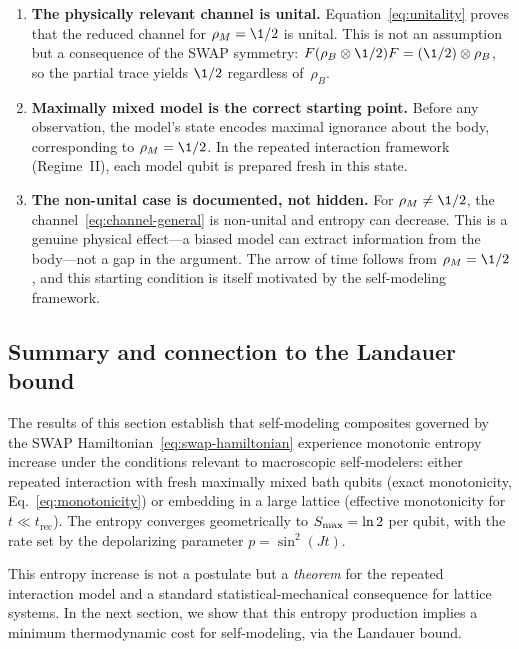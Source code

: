 \begin{enumerate}
  \item \textbf{The physically relevant channel is unital.}
    Equation~\eqref{eq:unitality} proves that the reduced channel
    for $\rho_M = \1/2$ is unital.  This is not an assumption but a
    consequence of the SWAP symmetry: $F(\rho_B \otimes \1/2)F
    = (\1/2) \otimes \rho_B$, so the partial trace yields
    $\1/2$ regardless of~$\rho_B$.

  \item \textbf{Maximally mixed model is the correct starting point.}
    Before any observation, the model's state encodes maximal
    ignorance about the body, corresponding to $\rho_M = \1/2$.
    In the repeated interaction framework (Regime~II), each model
    qubit is prepared fresh in this state.

  \item \textbf{The non-unital case is documented, not hidden.}
    For $\rho_M \neq \1/2$, the channel~\eqref{eq:channel-general}
    is non-unital and entropy can decrease.  This is a genuine
    physical effect---a biased model can extract information from the
    body---not a gap in the argument.  The arrow of time follows from
    $\rho_M = \1/2$, and this starting condition is itself motivated
    by the self-modeling framework.
\end{enumerate}

\subsection{Summary and connection to the Landauer
  bound}\label{sec:entropy-summary}

The results of this section establish that self-modeling composites
governed by the SWAP Hamiltonian~\eqref{eq:swap-hamiltonian}
experience monotonic entropy increase under the conditions relevant to
macroscopic self-modelers: either repeated interaction with fresh
maximally mixed bath qubits (exact monotonicity,
Eq.~\eqref{eq:monotonicity}) or embedding in a large lattice
(effective monotonicity for $t \ll t_{\mathrm{rec}}$).  The entropy
converges geometrically to $S_{\max} = \ln 2$ per qubit, with the rate
set by the depolarizing parameter $p = \sin^2(Jt)$.

This entropy increase is not a postulate but a \emph{theorem} for the
repeated interaction model and a standard statistical-mechanical
consequence for lattice systems.  In the next section, we show that
this entropy production implies a minimum thermodynamic cost for
self-modeling, via the Landauer bound.
